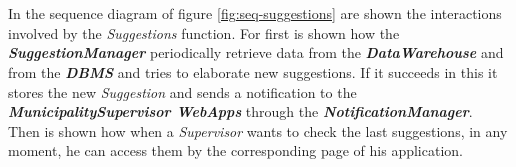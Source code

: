 \documentclass[a4paper]{report}
\begin{document}
\\\\
In the sequence diagram of figure \ref{fig:seq-suggestions} are shown the interactions involved by the \textit{Suggestions} function. For first is shown how the \textbf{\textit{SuggestionManager}} periodically retrieve data from the \textbf{\textit{DataWarehouse}} and from the \textbf{\textit{DBMS}} and tries to elaborate new suggestions. If it succeeds in this it stores the new \textit{Suggestion} and sends a notification to the \textbf{\textit{MunicipalitySupervisor WebApps}} through the \textbf{\textit{NotificationManager}}.\\
Then is shown how when a \textit{Supervisor} wants to check the last suggestions, in any moment, he can access them by the corresponding page of his application.
\end{document}
